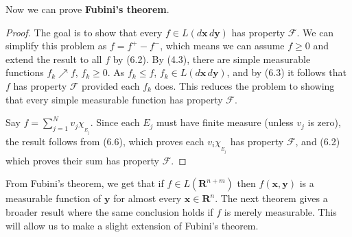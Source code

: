\documentclass[12pt]{book}
\renewcommand{\vec}[1]{\mathbf{#1}}
\renewcommand{\cal}[1]{\mathscr{#1}}
\newcommand{\ind}[1]{\chi_{_{#1}}}
\newcommand{\R}{\mathbf{R}}
\renewcommand{\.}{\mkern1mu}
\newcommand{\upto}{\nearrow}
\newenvironment{pf}{\begin{proof}\setlength{\parindent}{\normalparindent}\setlength{\parskip}{\normalparskip}}{\end{proof}}
\theoremstyle{theorem}
\newlength{\normalparindent}
\newlength{\normalparskip}
\begin{document}
	Now we can prove \textbf{Fubini's theorem}.	
	\begin{pf}
		The goal is to show that every $f \in L(d\vec x\, d\vec y)$ has property $\cal F$. We can simplify this problem as $f = f^+ - f^-$, which means we can assume $f \geq 0$ and extend the result to all $f$ by (6.2). By (4.3), there are simple measurable functions $f_k\upto f$, $f_k \geq 0$. As $f_k \leq f$, $f_k \in L(d\vec x\, d\vec y)$, and by (6.3) it follows that $f$ has property $\cal F$ provided each $f_k$ does. This reduces the problem to showing that every simple measurable function has property $\cal F$.
		
		Say $f = \sum_{j=1}^N v_j\ind{E_j}$. Since each $E_j$ must have finite measure (unless $v_j$ is zero), the result follows from (6.6), which proves each $v_i\ind{E_j}$ has property $\cal F$, and (6.2) which proves their sum has property $\cal F$.
	\end{pf}
	
	From Fubini's theorem, we get that if $f \in L(\R^{n+m})$ then $f(\vec x, \vec y)$ is a measurable function of $\vec y$ for almost every $\vec x \in \R^n$. The next theorem gives a broader result where the same conclusion holds if $f$ is merely measurable. This will allow us to make a slight extension of Fubini's theorem.\\
	
\end{document}

